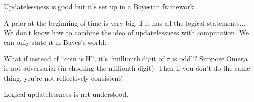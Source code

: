 \documentclass[11pt]{article}
\begin{document}
Updatelessness is good but it's set up in a Bayesian framework.

A prior at the beginning of time is very big, if it has all the logical statements... We don't know how to combine the idea of updatelessness with computation. We can only state it in Bayes's world.



What if instead of ``coin is H'', it's ``millionth digit of $\pi$ is odd''? Suppose Omega is not adversarial (in choosing the millionth digit). Then if you don't do the same thing, you're not reflectively consistent!

Logical updatelessness is not understood. 



\end{document}
